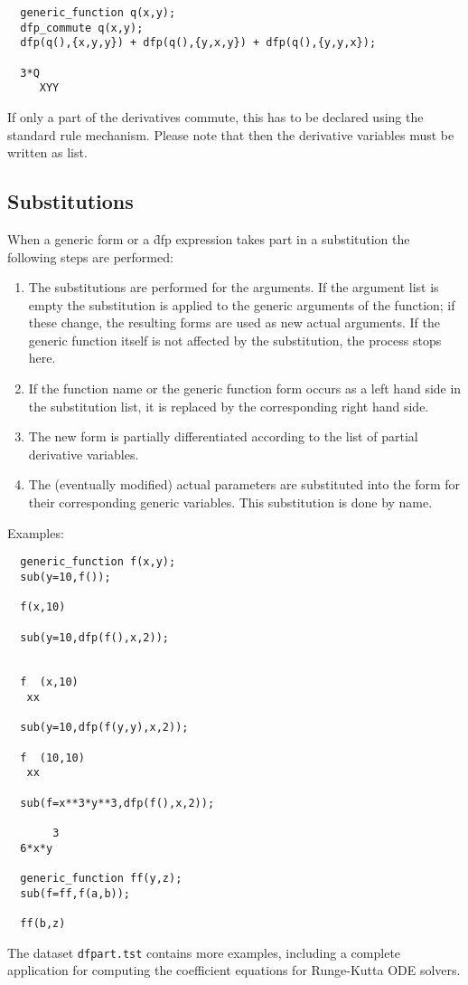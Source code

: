 \begin{verbatim}
  generic_function q(x,y);
  dfp_commute q(x,y);
  dfp(q(),{x,y,y}) + dfp(q(),{y,x,y}) + dfp(q(),{y,y,x});

  3*Q
     XYY
\end{verbatim}

If only a part of the derivatives commute, this has to be
declared using the standard {\REDUCE} rule mechanism. Please
note that then the derivative variables must be written as
list.

\subsection{Substitutions}

When a generic form or a \f{dfp} expression takes part in a 
substitution the following steps are performed:
\begin{enumerate}
\item The substitutions are performed for the arguments. If the
argument list is empty the substitution is applied to the
generic arguments of the function; if these change, the resulting
forms are used as new actual arguments.
If the generic function itself is not affected by the substitution,
the process stops here.
\item If the function name or the generic function
form occurs as a left hand side in the substitution list,
it is replaced by the corresponding right hand side.
\item The new form is partially differentiated according to the
list of partial derivative variables.
\item The (eventually modified) actual parameters are substituted
into the form for their corresponding generic variables.
This substitution is done by name.
\end{enumerate}

Examples:
\begin{verbatim}
  generic_function f(x,y);
  sub(y=10,f());
 
  f(x,10)

  sub(y=10,dfp(f(),x,2));


  f  (x,10)
   xx

  sub(y=10,dfp(f(y,y),x,2));

  f  (10,10)
   xx

  sub(f=x**3*y**3,dfp(f(),x,2));

       3
  6*x*y

  generic_function ff(y,z);
  sub(f=ff,f(a,b));

  ff(b,z)
\end{verbatim}

The dataset \texttt{dfpart.tst} contains more examples,
including a complete application for computing the coefficient
equations for Runge-Kutta ODE solvers.

